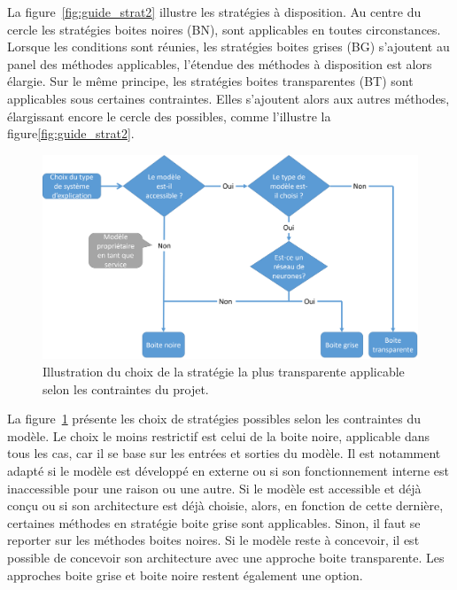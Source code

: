 La figure~\ref{fig:guide_strat2} illustre les stratégies à disposition. Au centre du cercle les stratégies boites noires (BN), sont applicables en toutes circonstances.
Lorsque les conditions sont réunies, les stratégies boites grises (BG) s'ajoutent au panel des méthodes applicables, l'étendue des méthodes à disposition est alors élargie.
Sur le même principe, les stratégies boites transparentes (BT) sont applicables sous certaines contraintes. Elles s'ajoutent alors aux autres méthodes, élargissant encore le cercle des possibles, comme l'illustre la figure\ref{fig:guide_strat2}.

\begin{figure}[htpb!]
    \centering
    \includegraphics[scale=0.22]{S5-Presentation_du_template_nlp/figures/guide_strat.png}
    \caption{Illustration du choix de la stratégie la plus transparente applicable selon les contraintes du projet.}
    \label{fig:guide_strat}
\end{figure}

La figure~\ref{fig:guide_strat} présente les choix de stratégies possibles selon les contraintes du modèle.
Le choix le moins restrictif est celui de la boite noire, applicable dans tous les cas, car il se base sur les entrées et sorties du modèle. Il est notamment adapté si le modèle est développé en externe ou si son fonctionnement interne est inaccessible pour une raison ou une autre.
Si le modèle est accessible et déjà conçu ou si son architecture est déjà choisie, alors, en fonction de cette dernière, certaines méthodes en stratégie boite grise sont applicables. Sinon, il faut se reporter sur les méthodes boites noires.
Si le modèle reste à concevoir, il est possible de concevoir son architecture avec une approche boite transparente. Les approches boite grise et boite noire restent également une option.


